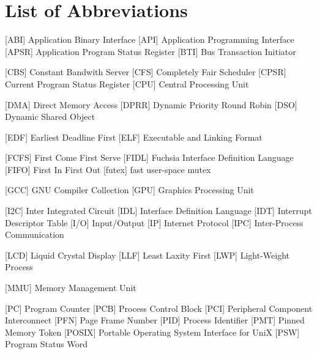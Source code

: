 
\chapter*{List of Abbreviations}

\begin{acronym} [POSIX]
 [ABI] {Application Binary Interface}
 [API] {Application Programming Interface}
 [APSR] {Application Program Status Register}
 [BTI] {Bus Transaction Initiator}

 [CBS] {Constant Bandwith Server}
 [CFS] {Completely Fair Scheduler}
 [CPSR] {Current Program Status Register}
 [CPU] {Central Processing Unit}

 [DMA] {Direct Memory Access}
 [DPRR] {Dynamic Priority Round Robin}
 [DSO] {Dynamic Shared Object}

 [EDF] {Earliest Deadline First}
 [ELF] {Executable and Linking Format}

 [FCFS] {First Come First Serve}
 [FIDL] {Fuchsia Interface Definition Language}
 [FIFO] {First In First Out}
 [futex] {fast user-space mutex}

 [GCC] {GNU Compiler Collection}
 [GPU] {Graphics Processing Unit}


 [I2C] {Inter Integrated Circuit}
 [IDL] {Interface Definition Language}
 [IDT] {Interrupt Descriptor Table}
 [I/O] {Input/Output}
 [IP] {Internet Protocol}
[IPC] {Inter-Process Communication}



 [LCD] {Liquid Crystal Display}
 [LLF] {Least Laxity First}
 [LWP] {Light-Weight Process}

 [MMU] {Memory Management Unit}



 [PC] {Program Counter}
 [PCB] {Process Control Block}
 [PCI] {Peripheral Component Interconnect}
 [PFN] {Page Frame Number}
 [PID] {Process Identifier}
 [PMT] {Pinned Memory Token}
 [POSIX] {Portable Operating System Interface for UniX}
 [PSW] {Program Status Word}


\end{acronym}
